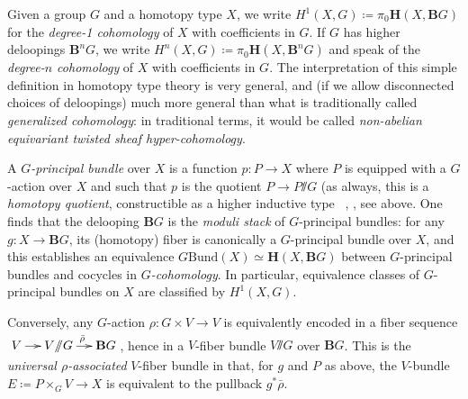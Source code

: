 \documentclass[copyright]{eptcs}
\renewcommand{\H}{\ensuremath{\mathbf{H}}\xspace}
\newcommand{\ssl}{\mathord{\sslash}}
\begin{document}
Given a group $G$ and a homotopy type $X$, we write
$
H^1(X,G) \coloneqq %
\pi_0 {\H(X,\mathbf{B}G)}
$
for the \emph{degree-1 cohomology} of $X$ with coefficients in $G$. If $G$ has higher
deloopings $\mathbf{B}^n G$, we write
$
H^n(X, G) \coloneqq %
\pi_0 {\H(X,\mathbf{B}^n G)}
$
and speak of the \emph{degree-$n$ cohomology} of $X$ with coefficients in $G$.
The interpretation of this simple definition in homotopy type theory is very general,
and (if we allow disconnected choices of deloopings) much more general than what is traditionally called \emph{generalized cohomology}:
in traditional terms, it would be called \emph{non-abelian equivariant twisted sheaf hyper-cohomology}.

A  \emph{$G$-principal bundle} over $X$ is a function $p : P \to X$ where $P$ is
equipped with a $G$-action over $X$ and such that $p$ is the quotient $P \to P\ssl G$
(as always, this is a \emph{homotopy quotient}, constructible as a higher inductive type
~\cite{ShulmanLumsdaine,hottbook},%
, see above.
One finds that the delooping $\mathbf{B}G$
is the \emph{moduli stack} of $G$-principal bundles: for any $g : X \to \mathbf{B}G$, its
(homotopy) fiber is canonically a $G$-principal bundle over $X$, and this establishes
an equivalence
$G \mathrm{Bund}(X) \simeq {\H(X,\mathbf{B}G)} $
between $G$-principal bundles and cocycles in \emph{$G$-cohomology}.
In particular, equivalence classes of $G$-principal bundles on $X$ are classified by $H^1(X,G)$.

Conversely, any $G$-action $\rho : G \times V \to V$ is equivalently encoded in
a fiber sequence
$
  \xymatrix@-1pc{
    V \ar[r] & V\ssl G \ar[r]^{\bar \rho}
  & \mathbf{B}G
  }
$,
hence in a $V$-fiber bundle $V\ssl G$ over $\mathbf{B}G$.
This is the \emph{universal $\rho$-associated} $V$-fiber bundle
in that, for $g$ and $P$ as above, the $V$-bundle $E \coloneqq P \times_G V \to X$
is equivalent to the pullback $g^* \bar \rho$.
\end{document}
